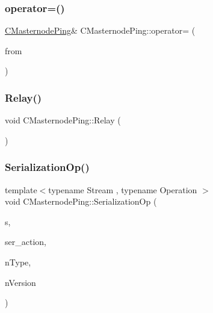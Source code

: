 \mbox{\label{class_c_masternode_ping_aa74630c2a9d7037bd2287d8076ad621f}} 
\subsubsection{\texorpdfstring{operator=()}{operator=()}}
{\footnotesize\ttfamily \mbox{\hyperlink{class_c_masternode_ping}{C\+Masternode\+Ping}}\& C\+Masternode\+Ping\+::operator= (\begin{DoxyParamCaption}\item[{\mbox{\hyperlink{class_c_masternode_ping}{C\+Masternode\+Ping}}}]{from }\end{DoxyParamCaption})\hspace{0.3cm}{\ttfamily [inline]}}

\mbox{\label{class_c_masternode_ping_a52f9892350ab8e94a63e9483f9a3b21d}} 
\subsubsection{\texorpdfstring{Relay()}{Relay()}}
{\footnotesize\ttfamily void C\+Masternode\+Ping\+::\+Relay (\begin{DoxyParamCaption}{ }\end{DoxyParamCaption})}

\mbox{\label{class_c_masternode_ping_a5d9d08a66b63c278d0dc18e733bdc636}} 
\subsubsection{\texorpdfstring{Serialization\+Op()}{SerializationOp()}}
{\footnotesize\ttfamily template$<$typename Stream , typename Operation $>$ \\
void C\+Masternode\+Ping\+::\+Serialization\+Op (\begin{DoxyParamCaption}\item[{Stream \&}]{s,  }\item[{Operation}]{ser\+\_\+action,  }\item[{int}]{n\+Type,  }\item[{int}]{n\+Version }\end{DoxyParamCaption})\hspace{0.3cm}{\ttfamily [inline]}}

